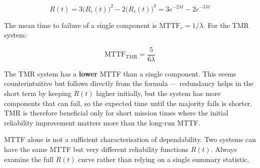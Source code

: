 \[
    R(t) = 3\bigl(R_c(t)\bigr)^2 - 2\bigl(R_c(t)\bigr)^3
         = 3e^{-2\lambda t} - 2e^{-3\lambda t}
\]

The mean time to failure of a single component is $\mathrm{MTTF}_c 
= 1/\lambda$. For the TMR system:

\[
    \mathrm{MTTF}_{\mathrm{TMR}} = \frac{5}{6\lambda}
\]

\begin{warnbox}
    The TMR system has a \textbf{lower} MTTF than a single component. 
    This seems counterintuitive but follows directly from the formula 
    --- redundancy helps in the short term by keeping $R(t)$ higher 
    initially, but the system has more components that can fail, so 
    the expected time until the majority fails is shorter. TMR is 
    therefore beneficial only for short mission times where the 
    initial reliability improvement matters more than the long-run 
    MTTF.
\end{warnbox}

\begin{keybox}
    MTTF alone is not a sufficient characterisation of dependability. 
    Two systems can have the same MTTF but very different reliability 
    functions $R(t)$. Always examine the full $R(t)$ curve rather 
    than relying on a single summary statistic.
\end{keybox}



